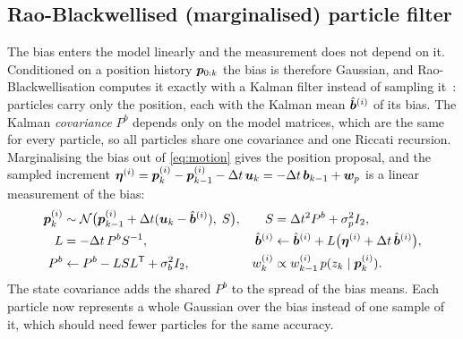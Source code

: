 \subsection{Rao-Blackwellised (marginalised) particle filter}\label{sec:rbpf}
The bias enters the model linearly and the measurement does not depend on it. Conditioned on a
position history $\bm{p}_{0:k}$ the bias is therefore Gaussian, and Rao-Blackwellisation computes it
exactly with a Kalman filter instead of sampling it~\cite{schon2005}: particles carry only the
position, each with the Kalman mean $\hat{\bm{b}}^{(i)}$ of its bias. The Kalman \emph{covariance}
$P^b$ depends only on the model matrices, which are the same for every particle, so all
particles share one covariance and one Riccati recursion. Marginalising the bias out of
\eqref{eq:motion} gives the position proposal, and the sampled increment
$\bm{\eta}^{(i)} = \bm{p}_k^{(i)} - \bm{p}_{k-1}^{(i)} - \Delta t\,\bm{u}_k = -\Delta t\,\bm{b}_{k-1} + \bm{w}_p$
is a linear measurement of the bias:
\begin{align}
  \bm{p}_k^{(i)} &\sim \mathcal{N}\bigl(\bm{p}_{k-1}^{(i)} + \Delta t(\bm{u}_k - \hat{\bm{b}}^{(i)}),\; S\bigr),
  & S &= \Delta t^2 P^b + \sigma_p^2 I_2,\\
  L &= -\Delta t\, P^b S^{-1}, & \hat{\bm{b}}^{(i)} &\leftarrow \hat{\bm{b}}^{(i)} + L\bigl(\bm{\eta}^{(i)} + \Delta t\,\hat{\bm{b}}^{(i)}\bigr),\\
  P^b &\leftarrow P^b - L S L^{\mathsf{T}} + \sigma_b^2 I_2, & w_k^{(i)} &\propto w_{k-1}^{(i)}\, p(z_k \mid \bm{p}_k^{(i)}).
\end{align}
The state covariance adds the shared $P^b$ to the spread of the bias means. Each particle now
represents a whole Gaussian over the bias instead of one sample of it, which should need fewer
particles for the same accuracy.

